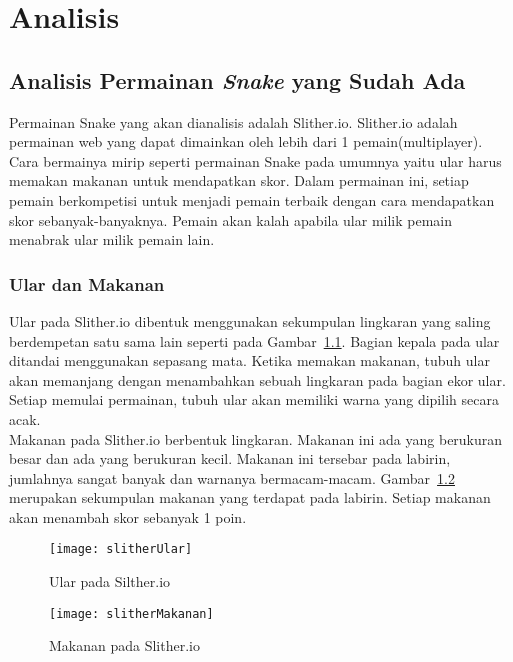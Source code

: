 \chapter{Analisis}
\label{chap:analisis}

\section{Analisis Permainan \textit{Snake} yang Sudah Ada}
Permainan Snake yang akan dianalisis adalah Slither.io. Slither.io adalah permainan web yang dapat dimainkan oleh lebih dari 1 pemain(multiplayer). Cara bermainya mirip seperti permainan Snake pada umumnya yaitu ular harus memakan makanan untuk mendapatkan skor. Dalam permainan ini, setiap pemain berkompetisi untuk menjadi pemain terbaik dengan cara mendapatkan skor sebanyak-banyaknya. Pemain akan   kalah apabila ular milik pemain menabrak ular milik pemain lain. 

\subsection{Ular dan Makanan}
Ular pada Slither.io dibentuk menggunakan sekumpulan lingkaran yang saling berdempetan satu sama lain seperti pada Gambar~\ref{fig:slitherUlar}. Bagian kepala pada ular ditandai menggunakan sepasang mata. Ketika memakan makanan, tubuh ular akan memanjang dengan menambahkan sebuah lingkaran pada bagian ekor ular. Setiap memulai permainan, tubuh ular akan memiliki warna yang dipilih secara acak.\\

Makanan pada Slither.io berbentuk lingkaran. Makanan ini ada yang berukuran besar dan ada yang berukuran kecil. Makanan ini tersebar pada labirin, jumlahnya sangat banyak dan warnanya bermacam-macam. Gambar~\ref{fig:slitherMakanan} merupakan sekumpulan makanan yang terdapat pada labirin. Setiap makanan akan menambah skor sebanyak 1 poin.

\begin{figure}[H]
	\centering  
	\texttt{[image: slitherUlar]}  
	\caption[Ular pada Silther.io]{Ular pada Silther.io}
	\label{fig:slitherUlar} 
\end{figure}

\begin{figure}[H]
	\centering  
	\texttt{[image: slitherMakanan]}  
	\caption[Makanan pada Slither.io]{Makanan pada Slither.io}
	\label{fig:slitherMakanan} 
\end{figure}

